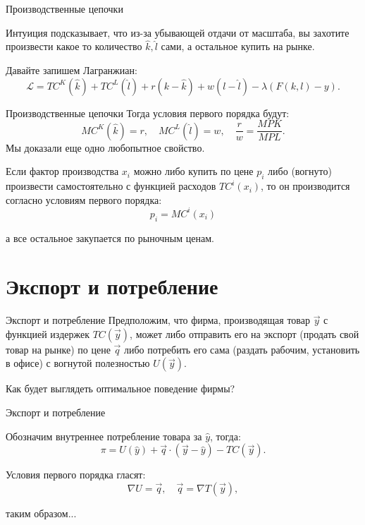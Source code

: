 \documentclass{beamer}
\begin{document}
\begin{frame}{Производственные цепочки}

Интуиция подсказывает, что из-за убывающей отдачи от масштаба, вы захотите произвести какое то количество $\hat k, \hat l$ сами, а остальное купить на рынке. 

Давайте запишем Лагранжиан:
$$
\mathcal{L} = TC^K(\hat k) + TC^L(\hat l) + r(k-\hat k) + w(l - \hat l) - \lambda (F(k,l) - y).
$$

\end{frame}

\begin{frame}{Производственные цепочки}
Тогда условия первого порядка будут:
$$ MC^K(\hat k) = r, \quad MC^L(\hat l) = w, \quad \frac{r}{w} = \frac{MPK}{MPL}.$$
Мы доказали еще одно любопытное свойство.

\begin{lemma}
Если фактор производства $x_i$ можно либо купить по цене $p_i$ либо (вогнуто) произвести самостоятельно с функцией расходов $TC^i(x_i)$, то он производится согласно условиям первого порядка:
$$ p_i = MC^i(x_i)$$

а все остальное закупается по рыночным ценам.
\end{lemma}
\end{frame}

\section{Экспорт и потребление}

\begin{frame}{Экспорт и потребление}
Предположим, что фирма, производящая товар $\vec y$ с функцией издержек $TC(\vec y)$, может либо отправить его на экспорт (продать свой товар на рынке) по цене $\vec q$ либо потребить его сама (раздать рабочим, установить в офисе) с вогнутой полезностью $U(\vec y)$. 

Как будет выглядеть оптимальное поведение фирмы?
\end{frame}

\begin{frame}{Экспорт и потребление}

Обозначим внутреннее потребление товара за $\hat y$, тогда:
$$ \pi = U(\hat y) + \vec q \cdot (\vec y - \hat y) - TC(\vec y).$$

Условия первого порядка гласят:
$$ \nabla U = \vec q, \quad \vec q = \nabla T(\vec y),$$

таким образом...
\end{frame}
\end{document}
